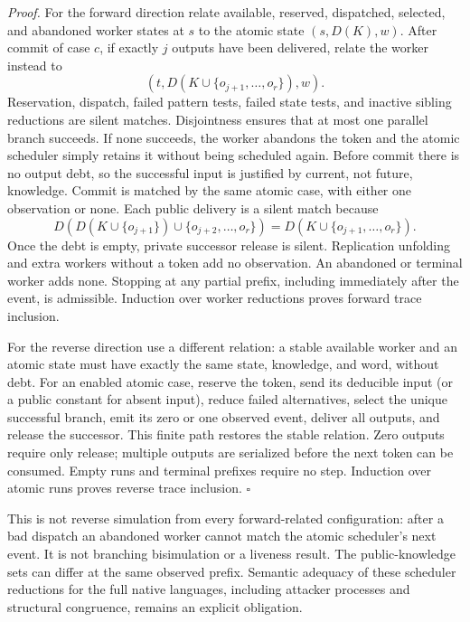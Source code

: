 \emph{Proof.}
For the forward direction relate available, reserved, dispatched,
selected, and abandoned worker states at $s$ to the atomic state
$(s,D(K),w)$. After commit of case $c$, if exactly $j$ outputs have
been delivered, relate the worker instead to
\[
 (t,D(K\cup\{o_{j+1},\ldots,o_r\}),w).
\]
Reservation, dispatch, failed pattern tests, failed state tests, and
inactive sibling reductions are silent matches. Disjointness ensures
that at most one parallel branch succeeds. If none succeeds, the worker
abandons the token and the atomic scheduler simply retains it without
being scheduled again. Before commit there is no output debt, so the
successful input is justified by current, not future, knowledge.
Commit is matched by the same atomic case, with either one observation
or none. Each public delivery is a silent match because
\[
 D(D(K\cup\{o_{j+1}\})\cup\{o_{j+2},\ldots,o_r\})
 =D(K\cup\{o_{j+1},\ldots,o_r\}).
\]
Once the debt is empty, private successor release is silent. Replication
unfolding and extra workers without a token add no observation. An
abandoned or terminal worker adds none. Stopping at any partial prefix,
including immediately after the event, is admissible. Induction over
worker reductions proves forward trace inclusion.

For the reverse direction use a different relation: a stable available
worker and an atomic state must have exactly the same state, knowledge,
and word, without debt. For an enabled atomic case, reserve the token,
send its deducible input (or a public constant for absent input), reduce
failed alternatives, select the unique successful branch, emit its zero
or one observed event, deliver all outputs, and release the successor.
This finite path restores the stable relation. Zero outputs require
only release; multiple outputs are serialized before the next token
can be consumed. Empty runs and terminal prefixes require no step.
Induction over atomic runs proves reverse trace inclusion.
\hfill$\square$

This is not reverse simulation from every forward-related configuration:
after a bad dispatch an abandoned worker cannot match the atomic
scheduler's next event. It is not branching bisimulation or a liveness
result. The public-knowledge sets can differ at the same observed prefix.
Semantic adequacy of these scheduler reductions for the full native
languages, including attacker processes and structural congruence,
remains an explicit obligation.

